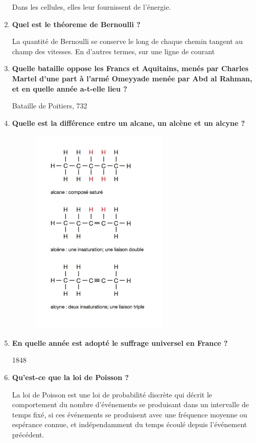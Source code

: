 \documentclass[12pt]{article}
\begin{document}
\begin{enumerate}
  Dans les cellules, elles leur fournissent de l'énergie.
  
  \item \textbf{Quel est le théoreme de Bernoulli ?}
  
  La quantité de Bernoulli se conserve le long de chaque chemin tangent au champ des vitesses. En d'autres termes, sur une ligne de courant
  
  \item \textbf{Quelle bataille oppose les Francs et Aquitains, menés par Charles Martel d'une part à l'armé Omeyyade menée par Abd al Rahman, et en quelle année a-t-elle lieu ?}
  
  Bataille de Poitiers, 732
  
  \item \textbf{Quelle est la différence entre un alcane, un alcène et un alcyne ?}
  
  \includegraphics[height=10cm,width=9cm]{alcane.png}
  
  \item \textbf{En quelle année est adopté le suffrage universel en France ?}
  
  1848
  
  \item \textbf{Qu'est-ce que la loi de Poisson ?}
  
  La loi de Poisson est une loi de probabilité discrète qui décrit le comportement du nombre d'événements se produisant dans un intervalle de temps fixé, si ces événements se produisent avec une fréquence moyenne ou espérance connue, et indépendamment du temps écoulé depuis l'événement précédent.
  

\end{enumerate}
\end{document}
